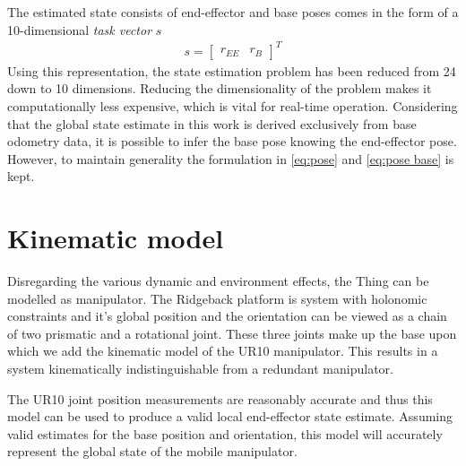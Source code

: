 \documentclass[times, utf8, diplomski, english]{fer}
\begin{document}
The estimated state consists of end-effector and base poses comes in the form of a 10-dimensional \textit{task vector} $s$
\begin{align}\label{eq:task_vector}
s = 
\begin{bmatrix}
r_{EE}& r_B
\end{bmatrix}^T
\end{align}
Using this representation, the state estimation problem has been reduced from 24 down to 10 dimensions.
Reducing the dimensionality of the problem makes it computationally less expensive, which is vital for real-time operation.
Considering that the global state estimate in this work is derived exclusively from base odometry data, it is possible to infer the base pose knowing the end-effector pose.
However, to maintain generality the formulation in \eqref{eq:pose} and \eqref{eq:pose base} is kept.

\section{Kinematic model}\label{section:Kinematics}
Disregarding the various dynamic and environment effects, the Thing can be modelled as manipulator.
The Ridgeback platform is system with holonomic constraints and it's global position and the orientation can be viewed as a chain of two prismatic and a rotational joint. 
These three joints make up the base upon which we add the kinematic model of the UR10 manipulator.
This results in a system kinematically indistinguishable from a redundant manipulator.

The UR10 joint position measurements are reasonably accurate and thus this model can be used to produce a valid local end-effector state estimate.
Assuming valid estimates for the base position and orientation, this model will accurately represent the global state of the mobile manipulator.
\end{document}
